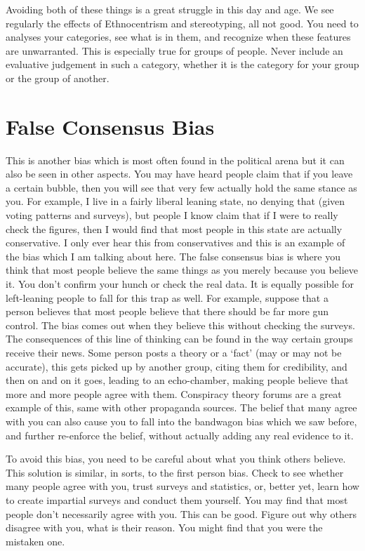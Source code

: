 Avoiding both of these things is a great struggle in this day and age. We see regularly the effects of Ethnocentrism and stereotyping, all not good. You need to analyses your categories, see what is in them, and recognize when these features are unwarranted. This is especially true for groups of people. Never include an evaluative judgement in such a category, whether it is the category for your group or the group of another.

\section{False Consensus Bias}

This is another bias which is most often found in the political arena but it can also be seen in other aspects. You may have heard people claim that if you leave a certain bubble, then you will see that very few actually hold the same stance as you. For example, I live in a fairly liberal leaning state, no denying that (given voting patterns and surveys), but people I know claim that if I were to really check the figures, then I would find that most people in this state are actually conservative. I only ever hear this from conservatives and this is an example of the bias which I am talking about here. The false consensus bias is where you think that most people believe the same things as you merely because you believe it. You don't confirm your hunch or check the real data. It is equally possible for left-leaning people to fall for this trap as well. For example, suppose that a person believes that most people believe that there should be far more gun control. The bias comes out when they believe this without checking the surveys. The consequences of this line of thinking can be found in the way certain groups receive their news. Some person posts a theory or a `fact' (may or may not be accurate), this gets picked up by another group, citing them for credibility, and then on and on it goes, leading to an echo-chamber, making people believe that more and more people agree with them. Conspiracy theory forums are a great example of this, same with other propaganda sources. The belief that many agree with you can also cause you to fall into the bandwagon bias which we saw before, and further re-enforce the belief, without actually adding any real evidence to it.

To avoid this bias, you need to be careful about what you think others believe. This solution is similar, in sorts, to the first person bias. Check to see whether many people agree with you, trust surveys and statistics, or, better yet, learn how to create impartial surveys and conduct them yourself.   You may find that most people don't necessarily agree with you. This can be good. Figure out why others disagree with you, what is their reason. You might find that you were the mistaken one.

